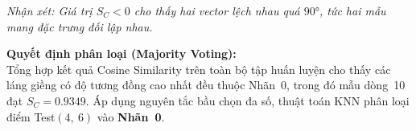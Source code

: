 \documentclass[12pt,a4paper]{article}
\begin{document}
\textit{Nhận xét: Giá trị $S_C < 0$ cho thấy hai vector lệch nhau quá
$90°$, tức hai mẫu mang đặc trưng đối lập nhau.}

\vspace{0.5cm}
\textbf{Quyết định phân loại (Majority Voting):}\\
Tổng hợp kết quả Cosine Similarity trên toàn bộ tập huấn luyện cho thấy
các láng giềng có độ tương đồng cao nhất đều thuộc Nhãn~0, trong đó mẫu
dòng~10 đạt $S_C = 0.9349$. Áp dụng nguyên tắc bầu chọn đa số, thuật
toán KNN phân loại điểm Test$(4,\ 6)$ vào \textbf{Nhãn~0}.
\end{document}
